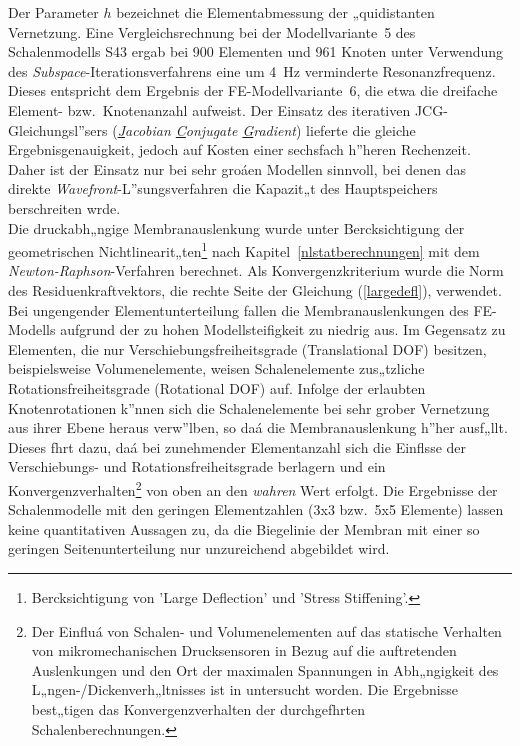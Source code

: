 Der Parameter $h$ bezeichnet die Elementabmessung der
„quidistanten Vernetzung.
Eine Vergleichsrechnung bei der Modellvariante~5 des Schalenmodells S43
ergab bei 900 Elementen und 961 Knoten unter Verwendung des
{\sl Subspace}-Iterationsverfahrens
eine um 4~Hz verminderte Resonanzfrequenz. Dieses entspricht dem Ergebnis
der FE-Modellvariante~6, die etwa die dreifache Element- bzw.\ Knotenanzahl
aufweist. Der Einsatz des iterativen JCG-Gleichungsl”sers
({\em \underline{J}acobian \underline{C}onjugate \underline{G}radient})
lieferte die
gleiche Ergebnisgenauigkeit, jedoch auf Kosten einer sechsfach h”heren
Rechenzeit. Daher ist der Einsatz nur bei sehr groáen Modellen sinnvoll,
bei denen das direkte {\sl Wavefront}-L”sungsverfahren die Kapazit„t des
Hauptspeichers berschreiten wrde.\\
Die druckabh„ngige Membranauslenkung wurde unter Bercksichtigung der
geometrischen Nichtlinearit„ten\footnote{Bercksichtigung von
'Large Deflection' und 'Stress Stiffening'.} nach
Kapitel~\ref{nlstatberechnungen} mit dem {\sl Newton-Raphson}-Verfahren
berechnet. Als Konvergenzkriterium wurde die Norm des Residuenkraftvektors,
die rechte Seite der Gleichung (\ref{largedefl}), verwendet.
Bei ungengender Elementunterteilung fallen die Membranauslenkungen des
FE-Modells aufgrund der zu hohen Modellsteifigkeit zu niedrig aus.
Im Gegensatz zu Elementen, die nur Verschiebungsfreiheitsgrade
(Translational DOF) besitzen, beispielsweise Volumenelemente, weisen
Schalenelemente zus„tzliche Rotationsfreiheitsgrade (Rotational DOF) auf.
Infolge der erlaubten Knotenrotationen k”nnen sich die Schalenelemente
bei sehr grober Vernetzung aus ihrer Ebene heraus verw”lben, so daá die
Membranauslenkung h”her ausf„llt. Dieses fhrt dazu, daá bei zunehmender
Ele\-mentanzahl sich die Einflsse der Verschiebungs- und
Rotationsfreiheitsgrade berlagern und ein
Konvergenzverhalten\footnote{Der
Einfluá von Schalen- und Volumenelementen auf das
statische Verhalten von mikromechanischen Drucksensoren in Bezug auf die
auftretenden Auslenkungen und den Ort der maximalen Spannungen in
Abh„ngigkeit des L„ngen-/Dickenverh„ltnisses ist in \cite{Tol92} untersucht
worden. Die Ergebnisse best„tigen das Konvergenzverhalten der durchgefhrten
Schalenberechnungen.}
von oben an den {\em wahren} Wert erfolgt. Die Ergebnisse der Schalenmodelle
mit den geringen Elementzahlen (3x3 bzw.\ 5x5 Elemente) lassen keine
quantitativen Aussagen zu, da die Biegelinie der Membran mit einer so
geringen Seitenunterteilung nur unzureichend abgebildet wird.
